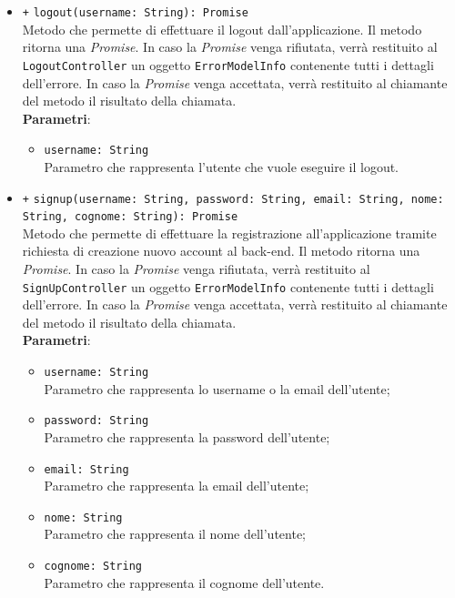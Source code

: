 \begin{itemize}
\begin{itemize}
		\item \texttt{+} \texttt{logout(username: String): Promise} \\ Metodo che permette di effettuare il logout dall'applicazione. Il metodo ritorna una \textit{Promise}. In caso la \textit{Promise} venga rifiutata, verrà restituito al \texttt{LogoutController} un oggetto \texttt{ErrorModelInfo} contenente tutti i dettagli dell'errore. In caso la \textit{Promise} venga accettata, verrà restituito al chiamante del metodo il risultato della chiamata.\\
		\textbf{Parametri}:
		\begin{itemize}
			\item \texttt{username: String} \\ Parametro che rappresenta l'utente che vuole eseguire il logout.
		\end{itemize}
		
		\item \texttt{+} \texttt{signup(username: String, password: String, email: String, nome: String, cognome: String): Promise} \\Metodo che permette di effettuare la registrazione all'applicazione tramite richiesta di creazione nuovo account al back-end. Il metodo ritorna una \textit{Promise}. In caso la \textit{Promise} venga rifiutata, verrà restituito al \texttt{SignUpController} un oggetto \texttt{ErrorModelInfo} contenente tutti i dettagli dell'errore. In caso la \textit{Promise} venga accettata, verrà restituito al chiamante del metodo il risultato della chiamata. \\
			\textbf{Parametri}:
			\begin{itemize}
				\item \texttt{username: String} \\ Parametro che rappresenta lo username o la email dell'utente;
				\item \texttt{password: String} \\ Parametro che rappresenta la password dell'utente;
				\item \texttt{email: String} \\ Parametro che rappresenta la email dell'utente;
				\item \texttt{nome: String} \\ Parametro che rappresenta il nome dell'utente;
				\item \texttt{cognome: String} \\ Parametro che rappresenta il cognome dell'utente.
			\end{itemize}
			

\end{itemize}
\end{itemize}
